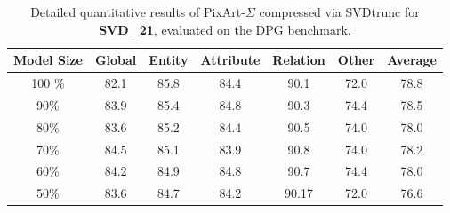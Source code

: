 \begin{table}[H]
	\centering
	{%
		
		\begin{tabular}{ccccccc}
			\toprule
			\multicolumn{1}{c}{\textbf{Model Size}} &
			\multicolumn{1}{c}{Global} &
			\multicolumn{1}{c}{Entity} &
			\multicolumn{1}{c}{Attribute} &
			\multicolumn{1}{c}{Relation} &
			\multicolumn{1}{c}{Other} &
			\multicolumn{1}{c}{Average}\\
			\midrule
	
				
		
						\color{gray} 100 \%  %
						& \color{gray} 82.1  %
						& \color{gray} 85.8  %
						& \color{gray} 84.4  %
						& \color{gray} 90.1  %
						& \color{gray} 72.0  %
						& \color{gray} 78.8  %
						\\
						\midrule
					
						90\% &    %
						83.9 &    %
						85.4 &    %
						84.8 &    %
						90.3 &    %
						74.4 &    %
						78.5     %
						\\
					
						80\% &    %
						83.6 &    %
						85.2 &    %
						84.4 &    %
						90.5 &    %
						74.0 &    %
						78.0     %
						\\
					
						70\% &    %
						84.5 &    %
						85.1 &    %
						83.9 &    %
						90.8 &    %
						74.0 &    %
						78.2     %
						\\
					
						60\% &    %
						84.2 &    %
						84.9 &    %
						84.8 &    %
						90.7 &    %
						74.4 &    %
						78.0    %
						\\
					
						50\% &    %
						83.6 &    %
						84.7 &    %
						84.2 &    %
						90.17 &    %
						72.0 &    %
						76.6     %
						\\
			\bottomrule
		\end{tabular}
	}
	\smallskip
	\caption[\gls{SVD}trunc on PixArt-$\Sigma$: Detailed DPG Results]{Detailed quantitative results of PixArt-$\Sigma$ compressed via \gls{SVD}trunc for \textbf{SVD\_21}, evaluated on the DPG benchmark.}
	\label{tab:PixArt_DPG}
\end{table}

